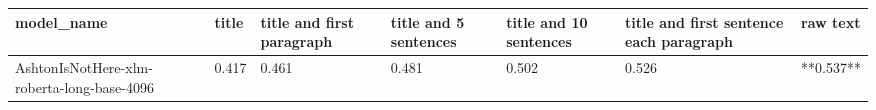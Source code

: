 \begin{tabular}{lllllll}
\toprule
                                model\_name & title & title and first paragraph & title and 5 sentences & title and 10 sentences & title and first sentence each paragraph &  raw text \\
\midrule
AshtonIsNotHere-xlm-roberta-long-base-4096 & 0.417 &                     0.461 &                 0.481 &                  0.502 &                                   0.526 & **0.537** \\
\bottomrule
\end{tabular}
